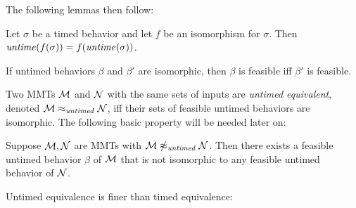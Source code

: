 \fi
\iflong
The following lemmas then follow:
\begin{lemma}
\label{lemma isomorphism}
Let $\sigma$ be a timed behavior and let $f$ be an isomorphism for $\sigma$.
Then $\mathit{untime}(f(\sigma)) = f(\mathit{untime}(\sigma))$.
\end{lemma}
\fi
\begin{lemma}
If untimed behaviors $\beta$ and $\beta'$ are isomorphic, then $\beta$ is feasible iff $\beta'$ is feasible.
\end{lemma}

Two MMTs ${\mathcal M}$ and ${\mathcal N}$ with the same sets of inputs are \emph{untimed equivalent}, denoted ${\mathcal M} \approx_{\mathit{untimed}} {\mathcal N}$, iff their sets of feasible untimed behaviors are isomorphic. The following basic property will be needed later on:

\begin{lemma}
\label{not untimed}
Suppose ${\mathcal M}, {\mathcal N}$ are MMTs with ${\mathcal M} \not\approx_{\mathit{untimed}} {\mathcal N}$.
Then there exists a feasible untimed behavior $\beta$ of ${\mathcal M}$ that is not isomorphic to any feasible untimed behavior of ${\mathcal N}$.
\end{lemma}

Untimed equivalence is finer than timed equivalence:

